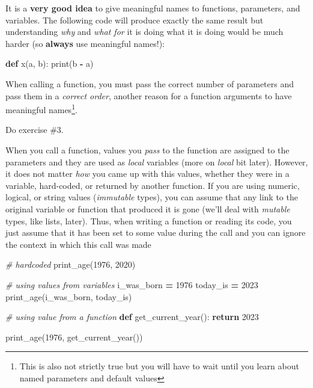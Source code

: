 \documentclass[
]{book}
\newenvironment{Shaded}{\begin{snugshade}}{\end{snugshade}}
\newcommand{\BuiltInTok}[1]{#1}
\newcommand{\CommentTok}[1]{\textcolor[rgb]{0.56,0.35,0.01}{\textit{#1}}}
\newcommand{\ControlFlowTok}[1]{\textcolor[rgb]{0.13,0.29,0.53}{\textbf{#1}}}
\newcommand{\DecValTok}[1]{\textcolor[rgb]{0.00,0.00,0.81}{#1}}
\newcommand{\KeywordTok}[1]{\textcolor[rgb]{0.13,0.29,0.53}{\textbf{#1}}}
\newcommand{\NormalTok}[1]{#1}
\newcommand{\OperatorTok}[1]{\textcolor[rgb]{0.81,0.36,0.00}{\textbf{#1}}}
\begin{document}
It is a \textbf{very good idea} to give meaningful names to functions, parameters, and variables. The following code will produce exactly the same result but understanding \emph{why} and \emph{what for} it is doing what it is doing would be much harder (so \textbf{always} use meaningful names!):

\begin{Shaded}
\begin{Highlighting}[]
\KeywordTok{def}\NormalTok{ x(a, b):}
    \BuiltInTok{print}\NormalTok{(b }\OperatorTok{{-}}\NormalTok{ a)}
\end{Highlighting}
\end{Shaded}

When calling a function, you must pass the correct number of parameters and pass them in a \emph{correct order}, another reason for a function arguments to have meaningful names\footnote{This is also not strictly true but you will have to wait until you learn about named parameters and default values}.

Do exercise \#3.

When you call a function, values you \emph{pass} to the function are assigned to the parameters and they are used as \emph{local} variables (more on \emph{local} bit later). However, it does not matter \emph{how} you came up with this values, whether they were in a variable, hard-coded, or returned by another function. If you are using numeric, logical, or string values (\emph{immutable} types), you can assume that any link to the original variable or function that produced it is gone (we'll deal with \emph{mutable} types, like lists, later). Thus, when writing a function or reading its code, you just assume that it has been set to some value during the call and you can ignore the context in which this call was made

\begin{Shaded}
\begin{Highlighting}[]
\CommentTok{\# hardcoded}
\NormalTok{print\_age(}\DecValTok{1976}\NormalTok{, }\DecValTok{2020}\NormalTok{)}

\CommentTok{\# using values from variables}
\NormalTok{i\_was\_born }\OperatorTok{=} \DecValTok{1976}
\NormalTok{today\_is }\OperatorTok{=} \DecValTok{2023}
\NormalTok{print\_age(i\_was\_born, today\_is)}

\CommentTok{\# using value from a function}
\KeywordTok{def}\NormalTok{ get\_current\_year():}
    \ControlFlowTok{return} \DecValTok{2023}

\NormalTok{print\_age(}\DecValTok{1976}\NormalTok{, get\_current\_year())}
\end{Highlighting}
\end{Shaded}
\end{document}
